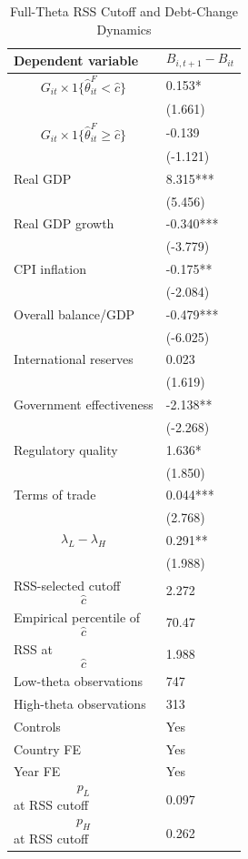 \begin{table}[H]\centering
\begin{threeparttable}
\caption{Full-Theta RSS Cutoff and Debt-Change Dynamics}
\label{tab:deltaB_rss_cutoff_fulltheta}
\scriptsize
\begin{tabularx}{\textwidth}{lY}
\toprule
Dependent variable & $$B_{i,t+1}-B_{it}$$ \\
\midrule
$$G_{it}\times 1\{\widehat{\theta}^{F}_{it}<\widehat{c}\}$$ & 0.153* \\
 & (1.661) \\
$$G_{it}\times 1\{\widehat{\theta}^{F}_{it}\geq\widehat{c}\}$$ & -0.139 \\
 & (-1.121) \\
Real GDP & 8.315*** \\
 & (5.456) \\
Real GDP growth & -0.340*** \\
 & (-3.779) \\
CPI inflation & -0.175** \\
 & (-2.084) \\
Overall balance/GDP & -0.479*** \\
 & (-6.025) \\
International reserves & 0.023 \\
 & (1.619) \\
Government effectiveness & -2.138** \\
 & (-2.268) \\
Regulatory quality & 1.636* \\
 & (1.850) \\
Terms of trade & 0.044*** \\
 & (2.768) \\
$$\lambda_L-\lambda_H$$ & 0.291** \\
 & (1.988) \\
\midrule
RSS-selected cutoff $$\widehat{c}$$ & 2.272 \\
Empirical percentile of $$\widehat{c}$$ & 70.47 \\
RSS at $$\widehat{c}$$ & 1.988 \\
Low-theta observations & 747 \\
High-theta observations & 313 \\
Controls & Yes \\
Country FE & Yes \\
Year FE & Yes \\
$$p_L$$ at RSS cutoff & 0.097 \\
$$p_H$$ at RSS cutoff & 0.262 \\

\end{tabularx}
\end{threeparttable}
\end{table}
